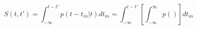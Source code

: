 \begin{equation}
S(t,t') = \int_{-\infty}^{t-t'} p(t-t_{in}|t) dt_{in} = \int_{-\infty}^{t-t'} \left[ \int_{-\infty}^\infty p()\right] dt_{in}
\end{equation}